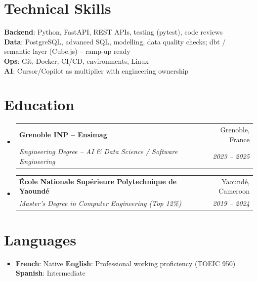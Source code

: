 \documentclass[letterpaper,10.5pt]{article}
\makeatletter
\newcommand{\resumeSubheading}[4]{
  \vspace{3pt}\item
  \begin{tabular*}{0.97\textwidth}[t]{l@{\extracolsep{\fill}}r}
    \textbf{#1} & #2 \\
    \textit{\small #3} & \textit{\small #4} \\
  \end{tabular*}\vspace{1pt}
}
\newcommand{\resumeSubHeadingListStart}{\begin{itemize}[leftmargin=0.08in, label={}]}
\newcommand{\resumeSubHeadingListEnd}{\end{itemize}}
\makeatother
\begin{document}
\section{Technical Skills}
\begin{itemize}[leftmargin=0.08in, label={}]
  \small{\item{
    \textbf{Backend}: Python, FastAPI, REST APIs, testing (pytest), code reviews \\
    \textbf{Data}: PostgreSQL, advanced SQL, modelling, data quality checks; dbt / semantic layer (Cube.js) -- ramp-up ready \\
    \textbf{Ops}: Git, Docker, CI/CD, environments, Linux \\
    \textbf{AI}: Cursor/Copilot as multiplier with engineering ownership
  }}
\end{itemize}

\section{Education}
\resumeSubHeadingListStart
  \resumeSubheading
    {Grenoble INP -- Ensimag}{Grenoble, France}
    {Engineering Degree -- AI \& Data Science / Software Engineering}{2023 -- 2025}
  \resumeSubheading
    {\'Ecole Nationale Sup\'erieure Polytechnique de Yaound\'e}{Yaound\'e, Cameroon}
    {Master's Degree in Computer Engineering (Top 12\%)}{2019 -- 2024}
\resumeSubHeadingListEnd

\section{Languages}
\begin{itemize}[leftmargin=0.08in, label={}]
  \item \textbf{French}: Native \quad \textbf{English}: Professional working proficiency (TOEIC 950) \quad \textbf{Spanish}: Intermediate
\end{itemize}
\end{document}
